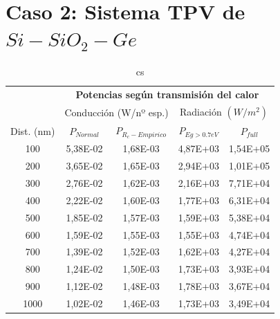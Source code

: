 \section{Caso 2: Sistema TPV de $Si-SiO_2-Ge$}
\begin{table}[h]
	\centering
		\begin{tabular}{|c||c|c||c|c|}
		\hline
\multirow{2}{*}{ }& \multicolumn{4}{c|}{\textbf{\large Potencias según transmisión del calor}}\\ \cline{2-5}
& \multicolumn{2}{c||}{Conducción (W/nº esp.)}& \multicolumn{2}{c|}{Radiación $(W/m^2)$}\\ \hline
Dist. (nm)&$P_{Normal}$&$P_{R_c-Empirico}$&$P_{Eg>0.7eV}$&$P_{full}$\\ \hline \hline
100&5,38E-02&1,68E-03&4,87E+03&1,54E+05\\ \hline 
200&3,65E-02&1,65E-03&2,94E+03&1,01E+05\\ \hline 
300&2,76E-02&1,62E-03&2,16E+03&7,71E+04\\ \hline 
400&2,22E-02&1,60E-03&1,77E+03&6,31E+04\\ \hline 
500&1,85E-02&1,57E-03&1,59E+03&5,38E+04\\ \hline 
600&1,59E-02&1,55E-03&1,55E+03&4,74E+04\\ \hline 
700&1,39E-02&1,52E-03&1,62E+03&4,27E+04\\ \hline 
800&1,24E-02&1,50E-03&1,73E+03&3,93E+04\\ \hline 
900&1,12E-02&1,48E-03&1,78E+03&3,67E+04\\ \hline 
1000&1,02E-02&1,46E-03&1,73E+03&3,49E+04\\ \hline 
		\end{tabular}
	\caption{cs}
	\label{tab:cs}
\end{table}
